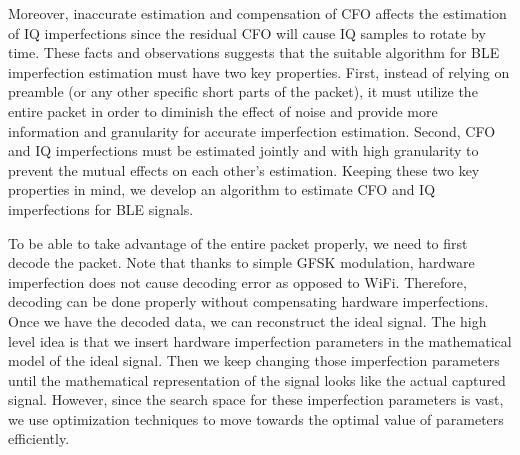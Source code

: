 Moreover, inaccurate estimation and compensation of CFO affects the estimation of IQ imperfections since the residual CFO will cause IQ samples to rotate by time. These facts and observations suggests that the suitable algorithm for BLE imperfection estimation must have two key properties. First, instead of relying on preamble (or any other specific short parts of the packet), it must utilize the entire packet in order to diminish the effect of noise and provide more information and granularity for accurate imperfection estimation. Second, CFO and IQ imperfections must be estimated jointly and with high granularity to prevent the mutual effects on each other's estimation. Keeping these two key properties in mind, we develop an algorithm to estimate CFO and IQ imperfections for BLE signals.

To be able to take advantage of the entire packet properly, we need to first decode the packet. Note that thanks to simple GFSK modulation, hardware imperfection does not cause decoding error as opposed to WiFi. Therefore, decoding can be done properly without compensating hardware imperfections. Once we have the decoded data, we can reconstruct the ideal signal. The high level idea is that we insert hardware imperfection parameters in the mathematical model of the ideal signal. Then we keep changing those imperfection parameters until the mathematical representation of the signal looks like the actual captured signal. However, since the search space for these imperfection parameters is vast, we use optimization techniques to move towards the optimal value of parameters efficiently.


